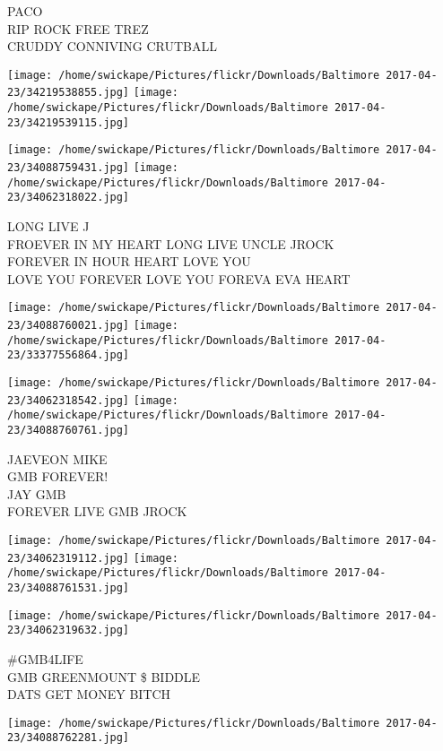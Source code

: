 \documentclass[10pt,letterpaper]{article}
\begin{document}
PACO\\
RIP ROCK FREE TREZ\\
CRUDDY CONNIVING CRUTBALL
\pagebreak

\texttt{[image: /home/swickape/Pictures/flickr/Downloads/Baltimore 2017-04-23/34219538855.jpg]}
\texttt{[image: /home/swickape/Pictures/flickr/Downloads/Baltimore 2017-04-23/34219539115.jpg]}

\texttt{[image: /home/swickape/Pictures/flickr/Downloads/Baltimore 2017-04-23/34088759431.jpg]}
\texttt{[image: /home/swickape/Pictures/flickr/Downloads/Baltimore 2017-04-23/34062318022.jpg]}

LONG LIVE J\\
FROEVER IN MY HEART LONG LIVE UNCLE JROCK\\
FOREVER IN HOUR HEART LOVE YOU\\
LOVE YOU FOREVER LOVE YOU FOREVA EVA HEART
\pagebreak

\texttt{[image: /home/swickape/Pictures/flickr/Downloads/Baltimore 2017-04-23/34088760021.jpg]}
\texttt{[image: /home/swickape/Pictures/flickr/Downloads/Baltimore 2017-04-23/33377556864.jpg]}

\texttt{[image: /home/swickape/Pictures/flickr/Downloads/Baltimore 2017-04-23/34062318542.jpg]}
\texttt{[image: /home/swickape/Pictures/flickr/Downloads/Baltimore 2017-04-23/34088760761.jpg]}

JAEVEON MIKE\\
GMB FOREVER!\\
JAY GMB\\
FOREVER LIVE GMB JROCK
\pagebreak

\texttt{[image: /home/swickape/Pictures/flickr/Downloads/Baltimore 2017-04-23/34062319112.jpg]}
\texttt{[image: /home/swickape/Pictures/flickr/Downloads/Baltimore 2017-04-23/34088761531.jpg]}

\vspace{0.25in}
\texttt{[image: /home/swickape/Pictures/flickr/Downloads/Baltimore 2017-04-23/34062319632.jpg]}

\#GMB4LIFE\\
GMB GREENMOUNT \$ BIDDLE\\
DATS GET MONEY BITCH
\pagebreak

\texttt{[image: /home/swickape/Pictures/flickr/Downloads/Baltimore 2017-04-23/34088762281.jpg]}
\end{document}
